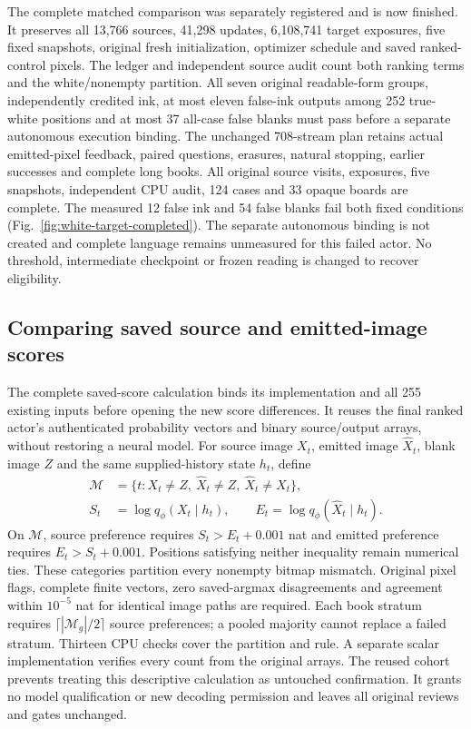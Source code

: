 \documentclass[12pt,a4paper]{article}
\providecommand{\DIFadd}[1]{{\protect\color{blue} \sf #1}} %
\begin{document}
\DIFadd{The complete matched comparison was separately registered and is now finished.
It preserves all 13,766 sources, 41,298 updates, 6,108,741 target exposures,
five fixed snapshots, original fresh initialization, optimizer schedule and
saved ranked-control pixels. The ledger and independent source audit count
both ranking terms and the white/nonempty partition. All seven original
readable-form groups, independently credited ink, at most eleven false-ink
outputs among 252 true-white positions and at most 37 all-case false blanks
must pass before a separate autonomous execution binding. The unchanged
708-stream plan retains actual emitted-pixel feedback, paired questions,
erasures, natural stopping, earlier successes and complete long books.
All original source visits, exposures, five snapshots, independent CPU audit,
124 cases and 33 opaque boards are complete. The measured 12 false ink and
54 false blanks fail both fixed conditions (Fig.~\ref{fig:white-target-completed}).
The separate autonomous binding is not created and complete language remains
unmeasured for this failed actor. No threshold, intermediate checkpoint or frozen
reading is changed to recover eligibility.
}

\subsection*{\DIFadd{Comparing saved source and emitted-image scores}}

\DIFadd{The complete saved-score calculation binds its implementation and all 255
existing inputs before opening the new score differences. It reuses the final
ranked actor's authenticated probability vectors and binary source/output
arrays, without restoring a neural model. For source image $X_t$, emitted image
$\widehat X_t$, blank image $Z$ and the same supplied-history state $h_t$, define
}\begin{equation}
 \begin{aligned}
 \mathcal M&=\{t:X_t\ne Z,\ \widehat X_t\ne Z,\ \widehat X_t\ne X_t\},\\
 S_t&=\log q_\phi(X_t\mid h_t),\qquad
 E_t=\log q_\phi(\widehat X_t\mid h_t).
 \end{aligned}
 \label{eq:saved-glyph-score-gap}
\end{equation}
\DIFadd{On $\mathcal M$, source preference requires $S_t>E_t+0.001$ nat and emitted
preference requires $E_t>S_t+0.001$. Positions satisfying neither inequality
remain numerical ties.
These categories partition every nonempty bitmap mismatch. Original pixel
flags, complete finite vectors, zero saved-argmax disagreements and agreement
within $10^{-5}$ nat for identical image paths are required. Each book stratum
requires $\lceil|\mathcal M_g|/2\rceil$ source preferences; a pooled majority
cannot replace a failed stratum. Thirteen CPU checks cover the partition and
rule. A separate scalar implementation verifies every count from the original
arrays. The reused cohort prevents treating this descriptive calculation as
untouched confirmation. It grants no model qualification or new decoding
permission and leaves all original reviews and gates unchanged.
}
\end{document}
